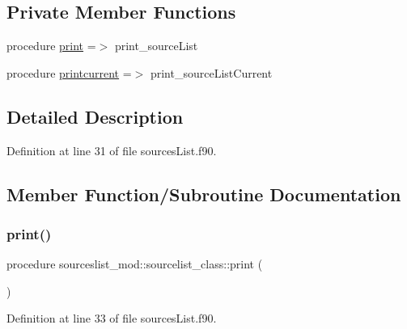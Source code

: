 \subsection*{Private Member Functions}
\begin{DoxyCompactItemize}
\item 
procedure \mbox{\hyperlink{structsourceslist__mod_1_1sourcelist__class_acaebfb4cd98c32e41f7f847973ebfa38}{print}} =$>$ print\+\_\+source\+List
\item 
procedure \mbox{\hyperlink{structsourceslist__mod_1_1sourcelist__class_a124192bce84ed89242128a91d755587f}{printcurrent}} =$>$ print\+\_\+source\+List\+Current
\end{DoxyCompactItemize}


\subsection{Detailed Description}


Definition at line 31 of file sources\+List.\+f90.



\subsection{Member Function/\+Subroutine Documentation}
\mbox{\label{structsourceslist__mod_1_1sourcelist__class_acaebfb4cd98c32e41f7f847973ebfa38}} 
\subsubsection{\texorpdfstring{print()}{print()}}
{\footnotesize\ttfamily procedure sourceslist\+\_\+mod\+::sourcelist\+\_\+class\+::print (\begin{DoxyParamCaption}{ }\end{DoxyParamCaption})\hspace{0.3cm}{\ttfamily [private]}}



Definition at line 33 of file sources\+List.\+f90.

\mbox{\label{structsourceslist__mod_1_1sourcelist__class_a124192bce84ed89242128a91d755587f}} 
